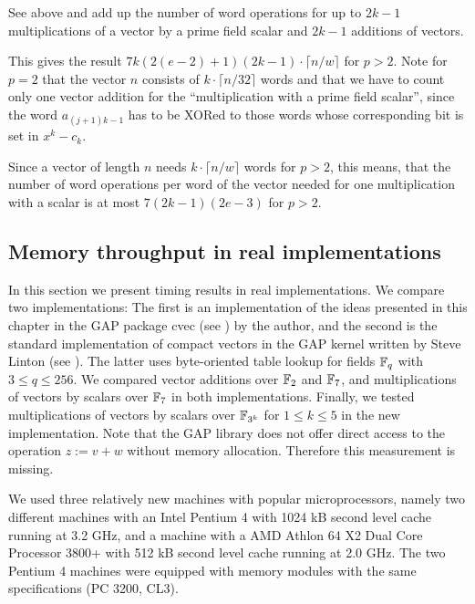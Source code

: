\Proof See above and add up the number of word operations for up
to $2k-1$ multiplications of a vector by a prime field scalar and $2k-1$
additions of vectors. 

This gives the result $7k(2(e-2)+1)(2k-1)\cdot
\lceil n/w \rceil$ for $p > 2$. Note for $p=2$ that the vector $n$ consists of
$k \cdot \lceil n/32 \rceil$ words and that we have to count only one
vector addition for the ``multiplication with a prime field scalar'', since 
the word $a_{(j+1)k-1}$ has to be XORed to those words whose corresponding
bit is set in $x^k - c_k$.
\ProofEnd

\begin{Rem}
Since a vector of length $n$ needs $k \cdot \lceil n/w \rceil$ words
for $p > 2$, this means, that the number of word operations per word of
the vector needed for one multiplication with a scalar is at most 
$7(2k-1)(2e-3)$ for $p > 2$.
\end{Rem}

\subsection{Memory throughput in real implementations}

In this section we present timing results in real implementations. We 
compare two implementations: The first is an implementation of the
ideas presented in this chapter in the {\sf GAP} package {\sf cvec}
(see \cite{cvec}) by the author, and the second is the standard implementation
of compact vectors in the {\sf GAP} kernel written by Steve Linton
(see \cite{GAP4}).
The latter uses byte-oriented table lookup for fields $\mathbb{F}_q$ with 
$3 \le q \le 256$. We compared vector additions over $\mathbb{F}_2$ and $\mathbb{F}_7$, 
and multiplications of vectors by scalars over $\mathbb{F}_7$ in both implementations.
Finally, we tested multiplications of vectors by scalars over $\mathbb{F}_{3^k}$
for $1 \le k \le 5$ in the new implementation.
Note that the {\sf GAP} library does not offer direct access to the
operation $z := v+w$ without memory allocation. Therefore this 
measurement is missing.

We used three relatively new machines with popular microprocessors, 
namely two different machines
with an Intel Pentium 4 with 1024 kB second level cache running at 3.2 GHz, 
and a machine with a AMD Athlon 64 X2 Dual Core Processor 3800+ with 512 kB
second level cache running at 2.0 GHz. The two Pentium 4 machines were
equipped with memory modules with the same specifications (PC 3200, CL3). 

